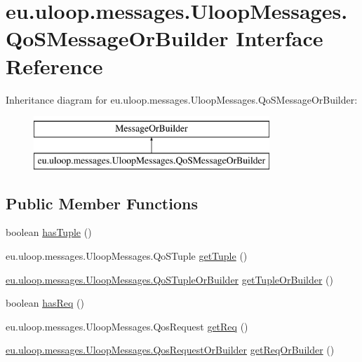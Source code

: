 \hypertarget{interfaceeu_1_1uloop_1_1messages_1_1UloopMessages_1_1QoSMessageOrBuilder}{\section{eu.\+uloop.\+messages.\+Uloop\+Messages.\+Qo\+S\+Message\+Or\+Builder Interface Reference}
\label{interfaceeu_1_1uloop_1_1messages_1_1UloopMessages_1_1QoSMessageOrBuilder}
}
Inheritance diagram for eu.\+uloop.\+messages.\+Uloop\+Messages.\+Qo\+S\+Message\+Or\+Builder\+:\begin{figure}[H]
\begin{center}
\leavevmode
\includegraphics[height=2.000000cm]{interfaceeu_1_1uloop_1_1messages_1_1UloopMessages_1_1QoSMessageOrBuilder}
\end{center}
\end{figure}
\subsection*{Public Member Functions}
\begin{DoxyCompactItemize}
\item 
boolean \hyperlink{interfaceeu_1_1uloop_1_1messages_1_1UloopMessages_1_1QoSMessageOrBuilder_ae71c834c8de416f3abbf62c8068cc34b}{has\+Tuple} ()
\item 
eu.\+uloop.\+messages.\+Uloop\+Messages.\+Qo\+S\+Tuple \hyperlink{interfaceeu_1_1uloop_1_1messages_1_1UloopMessages_1_1QoSMessageOrBuilder_a2b85843bf8226e5de1c86a781b36f50e}{get\+Tuple} ()
\item 
\hyperlink{interfaceeu_1_1uloop_1_1messages_1_1UloopMessages_1_1QoSTupleOrBuilder}{eu.\+uloop.\+messages.\+Uloop\+Messages.\+Qo\+S\+Tuple\+Or\+Builder} \hyperlink{interfaceeu_1_1uloop_1_1messages_1_1UloopMessages_1_1QoSMessageOrBuilder_a7168aa65339f894276f11cb45fd53dd4}{get\+Tuple\+Or\+Builder} ()
\item 
boolean \hyperlink{interfaceeu_1_1uloop_1_1messages_1_1UloopMessages_1_1QoSMessageOrBuilder_a791f44dad5bc28b88db7d9f731a282b7}{has\+Req} ()
\item 
eu.\+uloop.\+messages.\+Uloop\+Messages.\+Qos\+Request \hyperlink{interfaceeu_1_1uloop_1_1messages_1_1UloopMessages_1_1QoSMessageOrBuilder_ab401d6931e2b348e25fc5c8656138245}{get\+Req} ()
\item 
\hyperlink{interfaceeu_1_1uloop_1_1messages_1_1UloopMessages_1_1QosRequestOrBuilder}{eu.\+uloop.\+messages.\+Uloop\+Messages.\+Qos\+Request\+Or\+Builder} \hyperlink{interfaceeu_1_1uloop_1_1messages_1_1UloopMessages_1_1QoSMessageOrBuilder_a38597d3c36d910f717a28502b0ce9ed5}{get\+Req\+Or\+Builder} ()
\end{DoxyCompactItemize}


